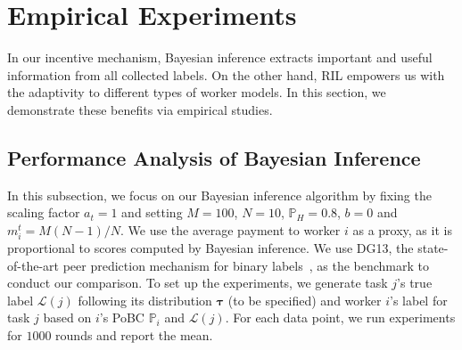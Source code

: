 \section{Empirical Experiments} 
In our incentive mechanism, Bayesian inference extracts important and useful information from all collected labels. On the other hand, RIL empowers us with the adaptivity to different types of worker models. In this section, we demonstrate these benefits via empirical studies.


\subsection{Performance Analysis of Bayesian Inference}
In this subsection, we focus on our Bayesian inference algorithm by fixing the scaling factor $a_t=1$ and setting $M=100$, $N=10$, $\mathbb{P}_H=0.8$, $b=0$ and $m_i^t=M(N-1)/N$. 
We use the average payment to worker $i$ as a proxy, as it is proportional to scores computed by Bayesian inference. We use DG13, the state-of-the-art peer prediction mechanism for binary labels~\citep{dasgupta2013crowdsourced}, as the benchmark to conduct our comparison. To set up the experiments, we generate task $j$'s true label $\mathcal{L}(j)$ following its distribution $\bm{\tau}$ (to be specified) and worker $i$'s label for task $j$ based on $i$'s PoBC $\mathbb{P}_i$ and $\mathcal{L}(j)$. For each data point, we run experiments for $1000$ rounds and report the mean.

